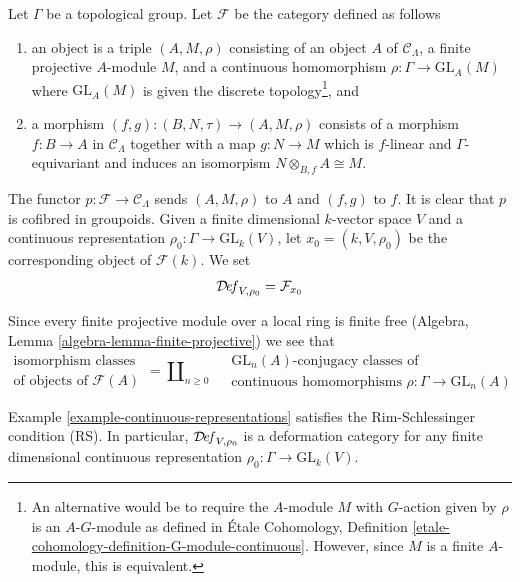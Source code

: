 \begin{example}
\label{example-continuous-representations}
Let $\Gamma$ be a topological group.
Let $\mathcal{F}$ be the category defined as follows
\begin{enumerate}
\item an object is a triple $(A, M, \rho)$ consisting of an
object $A$ of $\mathcal{C}_\Lambda$, a finite projective $A$-module $M$,
and a continuous homomorphism $\rho : \Gamma \to \text{GL}_A(M)$
where $\text{GL}_A(M)$ is given the discrete topology\footnote{An alternative
would be to require the $A$-module $M$ with $G$-action given by $\rho$
is an $A\text{-}G$-module as defined in \'Etale Cohomology, Definition
\ref{etale-cohomology-definition-G-module-continuous}. However,
since $M$ is a finite $A$-module, this is equivalent.}, and
\item a morphism $(f, g) : (B, N, \tau) \to (A, M, \rho)$ consists of
a morphism $f : B \to A$ in $\mathcal{C}_\Lambda$ together
with a map $g : N \to M$ which is $f$-linear and $\Gamma$-equivariant
and induces an isomorpism $N \otimes_{B, f} A \cong M$.
\end{enumerate}
The functor $p : \mathcal{F} \to \mathcal{C}_\Lambda$ sends $(A, M, \rho)$
to $A$ and $(f, g)$ to $f$. It is clear that $p$ is cofibred in groupoids.
Given a finite dimensional $k$-vector space $V$ and a
continuous representation $\rho_0 : \Gamma \to \text{GL}_k(V)$,
let $x_0 = (k, V, \rho_0)$ be the corresponding object of $\mathcal{F}(k)$.
We set
$$
\mathcal{D}\!\mathit{ef}_{V, \rho_0} = \mathcal{F}_{x_0}
$$
\end{example}

\noindent
Since every finite projective module over a local ring is finite free
(Algebra, Lemma \ref{algebra-lemma-finite-projective})
we see that
$$
\begin{matrix}
\text{isomorphism classes} \\
\text{of objects of }\mathcal{F}(A)
\end{matrix}
=
\coprod\nolimits_{n \geq 0}\quad
\begin{matrix}
\text{GL}_n(A)\text{-conjugacy classes of}\\
\text{continuous homomorphisms }\rho : \Gamma \to \text{GL}_n(A)
\end{matrix}
$$

\begin{lemma}
\label{lemma-continuous-representations-RS}
Example \ref{example-continuous-representations}
satisfies the Rim-Schlessinger condition (RS).
In particular, $\mathcal{D}\!\mathit{ef}_{V, \rho_0}$ is a deformation category
for any finite dimensional continuous representation
$\rho_0 : \Gamma \to \text{GL}_k(V)$.
\end{lemma}

